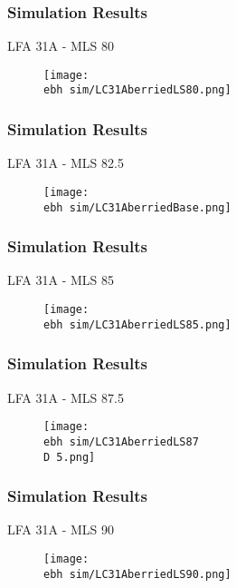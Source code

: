 \documentclass{beamer}
\newcommand{\ebh}{\string~/bio.data/bio.lobster/figures/LFA2733Framework2018/} %
\newcommand{\D}{.}
\begin{document}
\begin{frame}
\frametitle{Simulation Results}
LFA 31A - MLS 80
\begin{figure}
        \begin{center}
            \texttt{[image: \\ebh sim/LC31AberriedLS80.png]}
        \end{center}
    \end{figure}
\end{frame}


\begin{frame}
\frametitle{Simulation Results}
LFA 31A - MLS 82.5
\begin{figure}
        \begin{center}
            \texttt{[image: \\ebh sim/LC31AberriedBase.png]}
        \end{center}
    \end{figure}
\end{frame}



\begin{frame}
\frametitle{Simulation Results}
LFA 31A - MLS 85
\begin{figure}
        \begin{center}
            \texttt{[image: \\ebh sim/LC31AberriedLS85.png]}
        \end{center}
    \end{figure}
\end{frame}


\begin{frame}
\frametitle{Simulation Results}
LFA 31A - MLS 87.5
\begin{figure}
        \begin{center}
            \texttt{[image: \\ebh sim/LC31AberriedLS87\\D 5.png]}
        \end{center}
    \end{figure}
\end{frame}


\begin{frame}
\frametitle{Simulation Results}
LFA 31A - MLS 90
\begin{figure}
        \begin{center}
            \texttt{[image: \\ebh sim/LC31AberriedLS90.png]}
        \end{center}
    \end{figure}
\end{frame}
\end{document}
